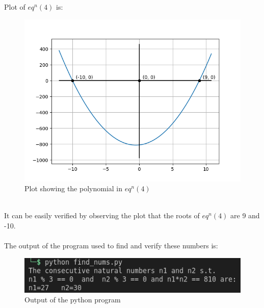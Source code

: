 \documentclass[journal, 12pt, twocolumn]{IEEEtran}
\begin{document}
    Plot of $eq^n(4)$ is:
    \begin{figure}[h]
        \centering
        \includegraphics[width=\columnwidth]{plot.png}
        \caption{Plot showing the polynomial in $eq^n(4)$}
        \label{Fig1}
    \end{figure}\\
    It can be easily verified by observing the plot that the roots of $eq^n (4)$ are 9 and -10.\\\\

    The output of the program used to find and verify these numbers is:
    \begin{figure}[h]
        \includegraphics[width=\columnwidth]{output.png}
        \caption{Output of the python program}
    \end{figure}
\end{document}
